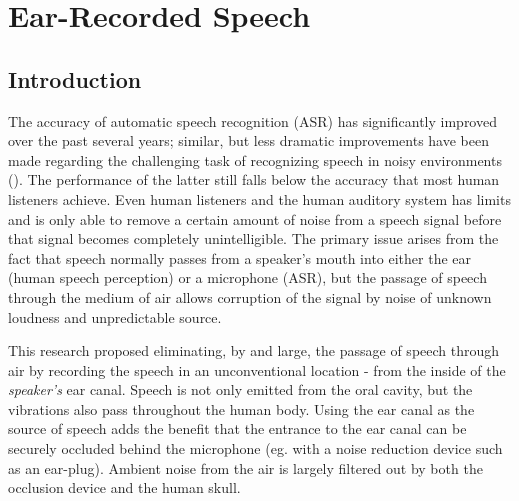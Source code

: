% 
% 
% 



\chapter{Ear-Recorded Speech\label{chapter2}}


\section{Introduction}

The accuracy of automatic speech recognition (ASR) has significantly improved over the past several years; similar, but less dramatic improvements have been made regarding the challenging task of recognizing speech in noisy environments (\cite{zhang:17}).  The performance of the latter still falls below the accuracy that most human listeners achieve.  Even human listeners and the human auditory system has limits and is only able to remove a certain amount of noise from a speech signal before that signal becomes completely unintelligible.  The primary issue arises from the fact that speech normally passes from a speaker's mouth into either the ear (human speech perception) or a microphone (ASR), but the passage of speech through the medium of air allows corruption of the signal by noise of unknown loudness and unpredictable source.  

This research proposed eliminating, by and large, the passage of speech through air by recording the speech in an unconventional location - from the inside of the \textit{speaker's} ear canal.  Speech is not only emitted from the oral cavity, but the vibrations also pass throughout the human body.  Using the ear canal as the source of speech adds the benefit that the entrance to the ear canal can be securely occluded behind the microphone (eg. with a noise reduction device such as an ear-plug).  Ambient noise from the air is largely filtered out by both the occlusion device and the human skull.

